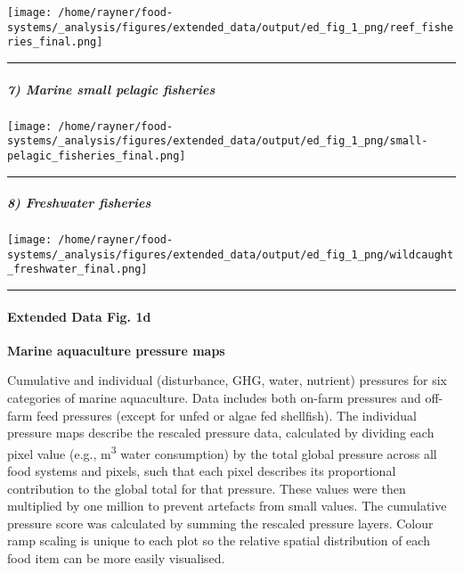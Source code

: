 \documentclass[
]{article}
\begin{document}
\texttt{[image: /home/rayner/food-systems/\_analysis/figures/extended\_data/output/ed\_fig\_1\_png/reef\_fisheries\_final.png]}

\begin{center}\rule{0.5\linewidth}{0.5pt}\end{center}

\hypertarget{marine-small-pelagic-fisheries}{%
\subparagraph{7) Marine small pelagic
fisheries}\label{marine-small-pelagic-fisheries}}

\texttt{[image: /home/rayner/food-systems/\_analysis/figures/extended\_data/output/ed\_fig\_1\_png/small-pelagic\_fisheries\_final.png]}

\begin{center}\rule{0.5\linewidth}{0.5pt}\end{center}

\hypertarget{freshwater-fisheries}{%
\subparagraph{8) Freshwater fisheries}\label{freshwater-fisheries}}

\texttt{[image: /home/rayner/food-systems/\_analysis/figures/extended\_data/output/ed\_fig\_1\_png/wildcaught\_freshwater\_final.png]}

\begin{center}\rule{0.5\linewidth}{0.5pt}\end{center}

\hypertarget{extended-data-fig.-1d}{%
\paragraph{Extended Data Fig. 1d}\label{extended-data-fig.-1d}}

\textbf{Marine aquaculture pressure maps}

Cumulative and individual (disturbance, GHG, water, nutrient) pressures
for six categories of marine aquaculture. Data includes both on-farm
pressures and off-farm feed pressures (except for unfed or algae fed
shellfish). The individual pressure maps describe the rescaled pressure
data, calculated by dividing each pixel value (e.g.,
m\textsuperscript{3} water consumption) by the total global pressure
across all food systems and pixels, such that each pixel describes its
proportional contribution to the global total for that pressure. These
values were then multiplied by one million to prevent artefacts from
small values. The cumulative pressure score was calculated by summing
the rescaled pressure layers. Colour ramp scaling is unique to each plot
so the relative spatial distribution of each food item can be more
easily visualised.
\end{document}
